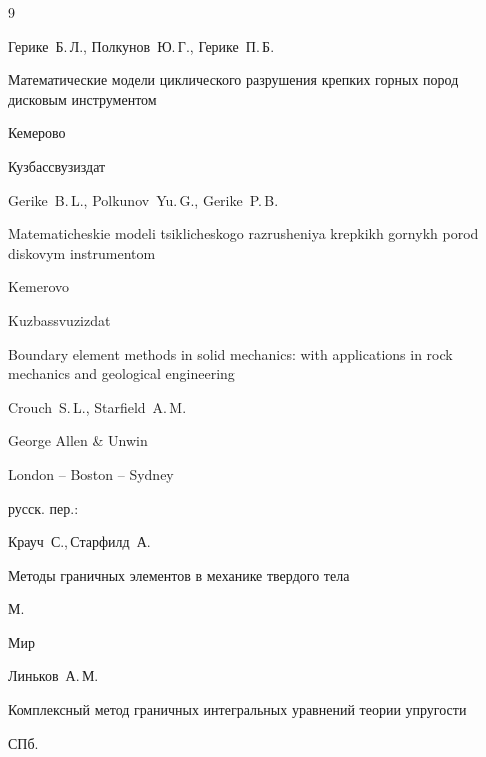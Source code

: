 \begin{thebibliography}{9}




\by Герике~Б.\,Л., Полкунов~Ю.\,Г., Герике~П.\,Б.

\book Математические модели циклического разрушения крепких горных пород дисковым инструментом

\publaddr Кемерово

\publ Кузбассвузиздат



\misctransl

\by Gerike~B.\,L., Polkunov~Yu.\,G., Gerike~P.\,B.

\book Matematicheskie modeli tsiklicheskogo razrusheniya krepkikh gornykh porod diskovym instrumentom

\publaddr Kemerovo

\publ Kuzbassvuzizdat








\book Boundary element methods in solid mechanics: with applications in rock mechanics and geological engineering

\by Crouch~S.\,L., Starfield~A.\,M.

\publ George Allen \& Unwin 

\publaddr London -- Boston -- Sydney



\rtransl русск. пер.:~

\by Крауч~С.,\,Старфилд~А.

\book Методы граничных элементов в механике твердого тела

\publaddr М.

\publ Мир






\by Линьков~А.\,М.

\book Комплексный метод граничных интегральных уравнений теории упругости

\publaddr СПб.


\end{thebibliography}
